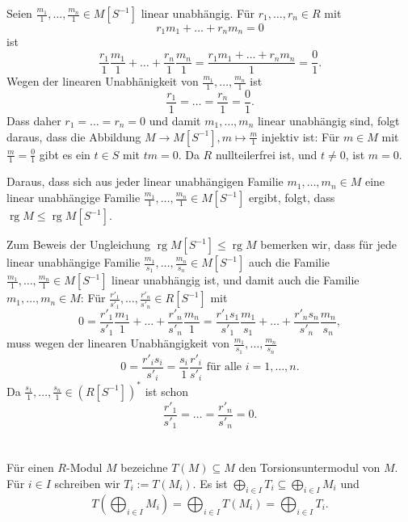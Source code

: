 \documentclass[a4paper,10pt]{article}
\theoremstyle{definition}
\newcommand{\rg}{\operatorname{rg}}
\begin{document}
Seien $\frac{m_1}{1}, \ldots, \frac{m_n}{1} \in M[S^{-1}]$ linear unabhängig. Für $r_1, \ldots, r_n \in R$ mit
\[
 r_1 m_1 + \ldots + r_n m_n = 0
\]
ist
\[
 \frac{r_1}{1} \frac{m_1}{1} + \ldots + \frac{r_n}{1} \frac{m_n}{1}
 = \frac{r_1 m_1 + \ldots + r_n m_n}{1}
 = \frac{0}{1}.
\]
Wegen der linearen Unabhänigkeit von $\frac{m_1}{1}, \ldots, \frac{m_n}{1}$ ist
\[
 \frac{r_1}{1} = \ldots = \frac{r_n}{1} = \frac{0}{1}.
\]
Dass daher $r_1 = \ldots = r_n = 0$ und damit $m_1, \ldots, m_n$ linear unabhängig sind, folgt daraus, dass die Abbildung $M \rightarrow M[S^{-1}], m \mapsto \frac{m}{1}$ injektiv ist: Für $m \in M$ mit $\frac{m}{1} = \frac{0}{1}$ gibt es ein $t \in S$ mit $tm = 0$. Da $R$ nullteilerfrei ist, und $t \neq 0$, ist $m = 0$.

Daraus, dass sich aus jeder linear unabhängigen Familie $m_1, \ldots, m_n \in M$ eine linear unabhängige Familie $\frac{m_1}{1}, \ldots, \frac{m_n}{1} \in M[S^{-1}]$ ergibt, folgt, dass $\rg M \leq \rg M[S^{-1}]$.

Zum Beweis der Ungleichung $\rg M[S^{-1}] \leq \rg M$ bemerken wir, dass für jede linear unabhängige Familie $\frac{m_1}{s_1}, \ldots, \frac{m_n}{s_n} \in M[S^{-1}]$ auch die Familie $\frac{m_1}{1}, \ldots, \frac{m_n}{1} \in M[S^{-1}]$ linear unabhängig ist, und damit auch die Familie $m_1, \ldots, m_n \in M$: Für $\frac{r'_1}{s'_1}, \ldots, \frac{r'_n}{s'_n} \in R[S^{-1}]$ mit
\[
 0
 = \frac{r'_1}{s'_1} \frac{m_1}{1} + \ldots + \frac{r'_n}{s'_n} \frac{m_n}{1}
 = \frac{r'_1 s_1}{s'_1} \frac{m_1}{s_1} + \ldots + \frac{r'_n s_n}{s'_n} \frac{m_n}{s_n},
\]
muss wegen der linearen Unabhängigkeit von $\frac{m_1}{s_1}, \ldots, \frac{m_n}{s_n}$
\[
 0 = \frac{r'_i s_i}{s'_i} = \frac{s_i}{1} \frac{r'_i}{s'_i} \text{ für alle } i=1,\ldots,n.
\]
Da $\frac{s_1}{1}, \ldots, \frac{s_n}{1} \in (R[S^{-1}])^*$ ist schon
\[
 \frac{r'_1}{s'_1} = \ldots = \frac{r'_n}{s'_n} = 0.
\]





\section{}


\subsection{}
Für einen $R$-Modul $M$ bezeichne $T(M) \subseteq M$ den Torsionsuntermodul von $M$. Für $i \in I$ schreiben wir $T_i := T(M_i)$. Es ist $\bigoplus_{i \in I} T_i \subseteq \bigoplus_{i \in I} M_i$ und
\[
 T\left( \bigoplus_{i \in I} M_i \right) = \bigoplus_{i \in I} T(M_i) = \bigoplus_{i \in I} T_i.
\]
\end{document}
